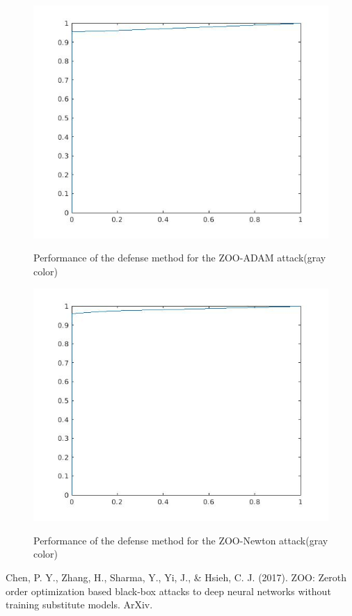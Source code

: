 \documentclass[a4paper]{article}
\begin{document}
\begin{figure}
\centering
\begin{minipage}[t]{0.45\textwidth}
\centering
\includegraphics[scale=0.3]{roc2.jpg}
\label{roc2}
\caption{Performance of the defense method for the ZOO-ADAM attack(gray color)}
\end{minipage}
\begin{minipage}[t]{0.45\textwidth}
\centering
\includegraphics[scale=0.3]{roc2_newton.jpg}
\label{roc2}
\caption{Performance of the defense method for the ZOO-Newton attack(gray color)}
\end{minipage}
\end{figure}

\begin{thebibliography}{9}
Chen, P. Y., Zhang, H., Sharma, Y., Yi, J., \& Hsieh, C. J. (2017). ZOO: Zeroth order optimization based black-box attacks to deep neural networks without training substitute models. ArXiv.
\end{thebibliography}
\end{document}
